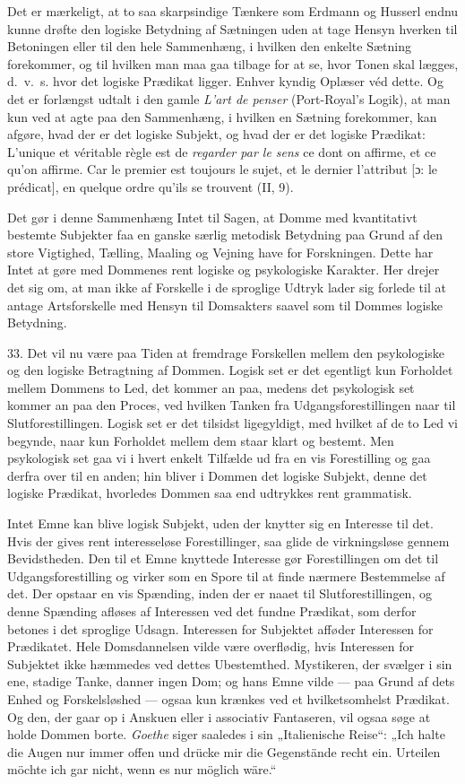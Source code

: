 \documentclass[12pt,a4paper]{book}
\newcommand{\apage}[1]{\marginnote{\footnotesize\textit{[#1]}}}
\begin{document}
Det er mærkeligt, at to saa skarpsindige Tænkere som Erdmann og Husserl
endnu kunne drøfte den logiske Betydning af Sætningen uden at tage
Hensyn hverken til Betoningen eller til den hele Sammenhæng, i hvilken
den enkelte Sætning forekommer, og til hvilken man maa gaa tilbage for
at se, hvor Tonen skal lægges, d.\ v.\ s. hvor det logiske Prædikat
ligger. Enhver kyndig Oplæser véd dette. Og det er forlængst udtalt i
den gamle \emph{L'art de penser} (Port-Royal’s Logik), at man kun ved at
agte paa den Sammenhæng, i hvilken en Sætning forekommer, kan afgøre,
hvad der er \apage{91} det logiske Subjekt, og hvad der er det logiske Prædikat:
L'unique et véritable règle est de \emph{regarder par le sens} ce dont
on affirme, et ce qu'on affirme. Car le premier est toujours le sujet,
et le dernier l'attribut [ɔ: le prédicat], en quelque ordre qu'ils se
trouvent (II, 9).

Det gør i denne Sammenhæng Intet til Sagen, at Domme med kvantitativt
bestemte Subjekter faa en ganske særlig metodisk Betydning paa Grund af
den store Vigtighed, Tælling, Maaling og Vejning have for Forskningen.
Dette har Intet at gøre med Dommenes rent logiske og psykologiske
Karakter. Her drejer det sig om, at man ikke af Forskelle i de sproglige
Udtryk lader sig forlede til at antage Artsforskelle med Hensyn til
Domsakters saavel som til Dommes logiske Betydning.

33. Det vil nu være paa Tiden at fremdrage Forskellen mellem den
psykologiske og den logiske Betragtning af Dommen. Logisk set er det
egentligt kun Forholdet mellem Dommens to Led, det kommer an paa, medens
det psykologisk set kommer an paa den Proces, ved hvilken Tanken fra
Udgangsforestillingen naar til Slutforestillingen. Logisk set er det
tilsidst ligegyldigt, med hvilket af de to Led vi begynde, naar kun
Forholdet mellem dem staar klart og bestemt. Men psykologisk set gaa vi
i hvert enkelt Tilfælde ud fra en vis Forestilling og gaa derfra over
til en anden; hin bliver i Dommen det logiske Subjekt, denne det logiske
Prædikat, hvorledes Dommen saa end udtrykkes rent grammatisk.

Intet Emne kan blive logisk Subjekt, uden der knytter sig en Interesse
til det. Hvis der gives rent interesseløse Forestillinger, saa glide de
virkningsløse gennem Bevidstheden. Den til et Emne knyttede Interesse
gør Forestillingen om det til Udgangsforestilling og virker som en Spore
til at finde nærmere Bestemmelse af det. Der opstaar en vis Spænding,
inden der er naaet til Slutforestillingen, og denne Spænding afløses af
Interessen ved det fundne Prædikat, som derfor betones i det sproglige
Udsagn. Interessen for Subjektet afføder Interessen for Prædikatet. Hele
Domsdannelsen \apage{92} vilde være overflødig, hvis Interessen for Subjektet ikke
hæmmedes ved dettes Ubestemthed. Mystikeren, der svælger i sin ene,
stadige Tanke, danner ingen Dom; og hans Emne vilde --- paa Grund af
dets Enhed og Forskelsløshed --- ogsaa kun krænkes ved et
hvilketsomhelst Prædikat. Og den, der gaar op i Anskuen eller i
associativ Fantaseren, vil ogsaa søge at holde Dommen borte.
\emph{Goethe} siger saaledes i sin „Italienische Reise“: „Ich halte die
Augen nur immer offen und drücke mir die Gegenstände recht ein. Urteilen
möchte ich gar nicht, wenn es nur möglich wäre.“
\end{document}
